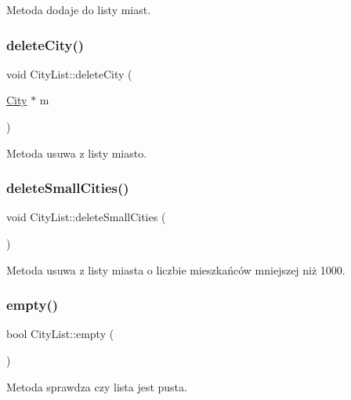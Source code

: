 Metoda dodaje do listy miast. 

\mbox{\label{struct_city_list_a81296a875ed31c453c8579fdb84d4be0}} 
\subsubsection{\texorpdfstring{deleteCity()}{deleteCity()}}
{\footnotesize\ttfamily void City\+List\+::delete\+City (\begin{DoxyParamCaption}\item[{\mbox{\hyperlink{struct_city}{City}} $\ast$}]{m }\end{DoxyParamCaption})}



Metoda usuwa z listy miasto. 

\mbox{\label{struct_city_list_a0c431be0c91c6b6b3d097118aa6c12fe}} 
\subsubsection{\texorpdfstring{deleteSmallCities()}{deleteSmallCities()}}
{\footnotesize\ttfamily void City\+List\+::delete\+Small\+Cities (\begin{DoxyParamCaption}{ }\end{DoxyParamCaption})}



Metoda usuwa z listy miasta o liczbie mieszkańców mniejszej niż 1000. 

\mbox{\label{struct_city_list_ac6bb86bf8511ba6bfc124f0c905cb08b}} 
\subsubsection{\texorpdfstring{empty()}{empty()}}
{\footnotesize\ttfamily bool City\+List\+::empty (\begin{DoxyParamCaption}{ }\end{DoxyParamCaption})}



Metoda sprawdza czy lista jest pusta. 

